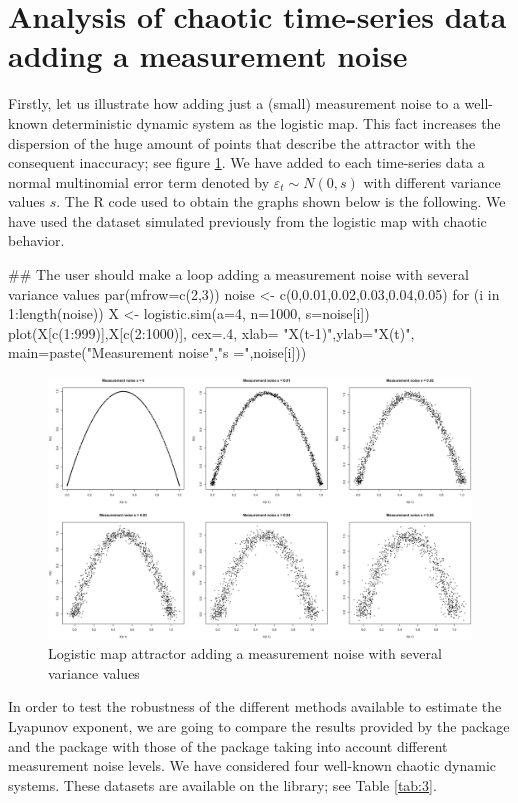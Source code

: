 \section{Analysis of chaotic time-series data adding a measurement noise}

Firstly, let us illustrate how adding just a (small) measurement noise to a well-known deterministic dynamic system as the logistic map. This fact increases the dispersion of the huge amount of points that describe the attractor with the consequent inaccuracy; see figure \ref{fig:1}. We have added to each time-series data a normal multinomial error term denoted by ${\varepsilon _t} \sim N\left( {0,s} \right)$ with different variance values $s$. The R code used to obtain the graphs shown below is the following. We have used the dataset simulated previously from the logistic map with chaotic behavior. 

\begin{example}
## The user should make a loop adding a measurement noise with several variance values
par(mfrow=c(2,3))
noise  <-  c(0,0.01,0.02,0.03,0.04,0.05)
for (i in 1:length(noise)){
  X    <-  logistic.sim(a=4, n=1000, s=noise[i])
           plot(X[c(1:999)],X[c(2:1000)], cex=.4, xlab= "X(t-1)",ylab="X(t)",
           main=paste("Measurement noise","s =",noise[i]))
}
\end{example}

\begin{figure}[ht!]
\centering
\includegraphics[width=\linewidth]{figure1}
\caption{\label{fig:1} Logistic map attractor adding a measurement noise with several variance values}
\end{figure}

In order to test the robustness of the different methods available to estimate the Lyapunov exponent, we are going to compare the results provided by the  package and the  package with those of the  package taking into account different measurement noise levels. We have considered four well-known chaotic dynamic systems. These datasets are available on the  library; see Table \ref{tab:3}. 

